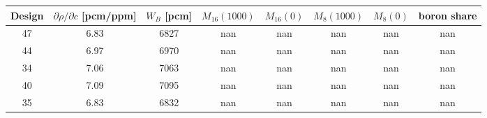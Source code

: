 \begin{tabular}{cccccccc}
\toprule
Design & $\partial\rho/\partial c$ [pcm/ppm] & $W_B$ [pcm] & $M_{16}(1000)$ & $M_{16}(0)$ & $M_{8}(1000)$ & $M_{8}(0)$ & boron share \\
\midrule
    47 & 6.83 & 6827 & nan & nan & nan & nan & nan \\
    44 & 6.97 & 6970 & nan & nan & nan & nan & nan \\
    34 & 7.06 & 7063 & nan & nan & nan & nan & nan \\
    40 & 7.09 & 7095 & nan & nan & nan & nan & nan \\
    35 & 6.83 & 6832 & nan & nan & nan & nan & nan \\
\bottomrule
\end{tabular}
